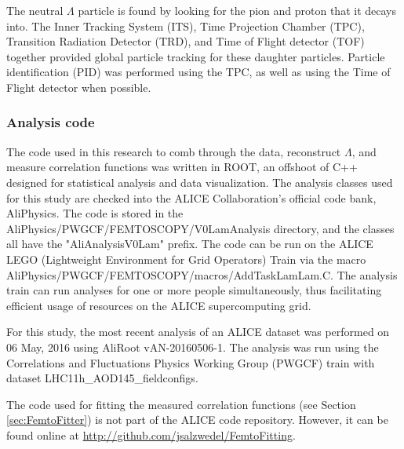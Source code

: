 The neutral $\Lambda$ particle is found by looking for the pion and proton that it decays into.
The Inner Tracking System (ITS), Time Projection Chamber (TPC), Transition Radiation Detector (TRD), and Time of Flight detector (TOF) together provided global particle tracking for these daughter particles.
Particle identification (PID) was performed using the TPC, as well as using the Time of Flight detector when possible.


\subsubsection{Analysis code}
The code used in this research to comb through the data, reconstruct $\Lambda$, and measure correlation functions was written in ROOT, an offshoot of C++ designed for statistical analysis and data visualization.
The analysis classes used for this study are checked into the ALICE Collaboration's official code bank, AliPhysics.
The code is stored in the AliPhysics/PWGCF/FEMTOSCOPY/V0LamAnalysis directory, and the classes all have the "AliAnalysisV0Lam" prefix.
The code can be run on the ALICE LEGO (Lightweight Environment for Grid Operators) Train via the macro AliPhysics/PWGCF/FEMTOSCOPY/macros/AddTaskLamLam.C.
The analysis train can run analyses for one or more people simultaneously, thus facilitating efficient usage of resources on the ALICE supercomputing grid.

For this study, the most recent analysis of an ALICE dataset was performed on 06 May, 2016 using AliRoot vAN-20160506-1.
The analysis was run using the Correlations and Fluctuations Physics Working Group (PWGCF) train with dataset LHC11h\_AOD145\_fieldconfigs.

The code used for fitting the measured correlation functions (see Section \ref{sec:FemtoFitter}) is not part of the ALICE code repository.
However, it can be found online at \url{http://github.com/jsalzwedel/FemtoFitting}.